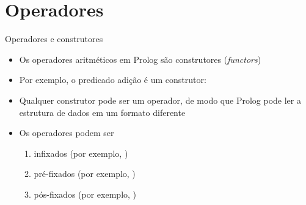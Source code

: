 \section{Operadores}

\begin{frame}[fragile]{Operadores e construtores}

    \begin{itemize}
        \item Os operadores aritméticos em Prolog são construtores (\textit{functors})

        \item Por exemplo, o predicado adição  é um construtor:


        \item Qualquer construtor pode ser um operador, de modo que Prolog pode ler a 
           estrutura de dados em um formato diferente

        \item Os operadores podem ser
        \begin{enumerate}
            \item infixados (por exemplo, )
            \item pré-fixados (por exemplo, )
            \item pós-fixados (por exemplo, )
        \end{enumerate}

    \end{itemize}

\end{frame}

